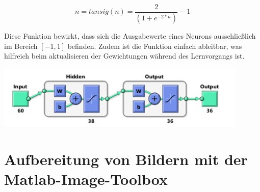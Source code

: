 \begin{equation}
n = tansig(n) =  \frac{2}{(1 + e^{-2*n})} - 1
\end{equation}

Diese Funktion bewirkt, dass sich die Ausgabewerte eines Neurons ausschließlich
im Bereich $[-1,1]$ befinden. Zudem ist die Funktion einfach ableitbar, was
hilfreich beim aktualisieren der Gewichtungen während des Lernvorgangs ist.

\begin{center}
  \includegraphics[width=12cm]{res/PatternNet-Aufbau.png}
\end{center}

\section{Aufbereitung von Bildern mit der Matlab-Image-Toolbox}
\label{images}
